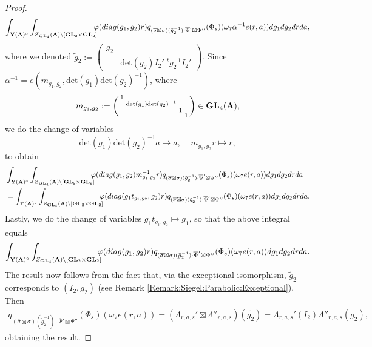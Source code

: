 \documentclass[10pt,a4paper]{amsart}
\def\A{{\bf A}}
\def\GL{\mathbf{GL}}
\begin{document}
\begin{proof}
        \begin{align*}
     \int_{ \mathbf{Y}(\A)^\circ } \int_{Z_{\GL_4}(\A)\backslash [\GL_2\times \GL_2]} \!\!\!\!\varphi({\rm diag}(g_1,g_2)r) 
       q_{(\overline{\sigma} \boxtimes \sigma)(\tilde{g}_2^{-1}) \cdot \overline{\Psi}'\boxtimes\Psi''}(\Phi_{s})(\omega_7 \alpha^{-1}e(r,a))dg_1dg_2drda,
       \end{align*}
       where we denoted $\tilde{g}_2 := \left(\begin{smallmatrix}g_2& \\ &\mathrm{det}(g_2)I_2'\;^tg_2^{-1}I_2'\end{smallmatrix}\right)$. Since $\alpha^{-1} = e\left(m_{g_1,g_2}, \mathrm{det}(g_1)\mathrm{det}(g_2)^{-1}\right)$, where $$m_{g_1,g_2} := \left(\begin{smallmatrix}1 & & & \\ &\mathrm{det}(g_1)\mathrm{det}(g_2)^{-1}& & \\ & &1 & \\ & & &1\end{smallmatrix}\right)\in \GL_4(\A),$$  we do the change of variables \[\mathrm{det}(g_1)\mathrm{det}(g_2)^{-1}a\mapsto a,\;\;\;\;m_{g_1,g_2}r\mapsto r,\]
       to obtain
       \begin{align*}
       &\int_{ \mathbf{Y}(\A)^\circ } \int_{Z_{\GL_4}(\A)\backslash [\GL_2\times \GL_2]} \!\!\!\!\varphi({\rm diag}(g_1 ,g_2) m_{g_1,g_2}^{-1} r) 
       q_{(\overline{\sigma} \boxtimes \sigma)(\tilde{g}_2^{-1}) \cdot \overline{\Psi}'\boxtimes\Psi''}(\Phi_{s})(\omega_7 e(r,a))dg_1dg_2drda \\ 
        &=\int_{ \mathbf{Y}(\A)^\circ } \int_{Z_{\GL_4}(\A)\backslash [\GL_2\times \GL_2]} \!\!\!\!\varphi({\rm diag}(g_1 t_{g_1,g_2},g_2) r) 
       q_{(\overline{\sigma} \boxtimes \sigma)(\tilde{g}_2^{-1}) \cdot \overline{\Psi}'\boxtimes\Psi''}(\Phi_{s})(\omega_7 e(r,a))dg_1dg_2drda .
        \end{align*}
      Lastly, we do the change of variables $g_1t_{g_1,g_2}\mapsto g_1$, so that the above integral equals 
        \begin{align*}
        \int_{ \mathbf{Y}(\A)^\circ } \int_{Z_{\GL_4}(\A)\backslash [\GL_2\times \GL_2]} \!\!\!\!\varphi({\rm diag}(g_1,g_2) r) 
       q_{(\overline{\sigma} \boxtimes \sigma)(\tilde{g}_2^{-1}) \cdot \overline{\Psi}'\boxtimes\Psi''}(\Phi_{s})(\omega_7 e(r,a))dg_1dg_2drda.  
             \end{align*}
      The result now follows from the fact that, via the exceptional isomorphism, $ \tilde{g}_2$ corresponds to $(I_2, g_2)$ (see Remark \ref{Remark:Siegel:Parabolic:Exceptional}). Then 
    \begin{align*}q_{(\overline{\sigma} \boxtimes \sigma)(\tilde{g}_2^{-1}) \cdot \overline{\Psi}'\boxtimes\Psi''}(\Phi_{s})(\omega_7e(r,a)) = \left( \Lambda_{r,a,s}'\boxtimes\Lambda''_{r,a,s}\right)(\tilde{g_2}) = \Lambda_{r,a,s}'(I_2)\Lambda''_{r,a,s}(g_2),
    \end{align*}
    obtaining the result. 
\end{proof}
\end{document}
